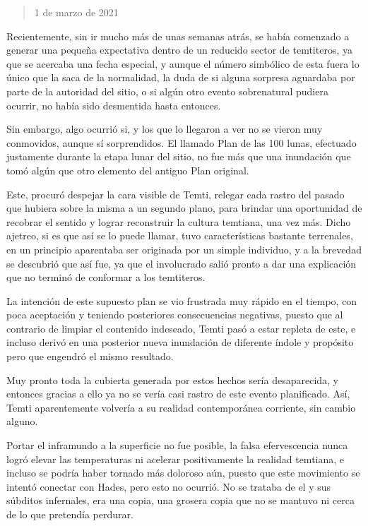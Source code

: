\documentclass[
  spanish,
]{book}
\begin{document}
\begin{quote}
1 de marzo de 2021
\end{quote}

Recientemente, sin ir mucho más de unas semanas atrás, se había comenzado a generar una pequeña expectativa dentro de un reducido sector de temtiteros, ya que se acercaba una fecha especial, y aunque el número simbólico de esta fuera lo único que la saca de la normalidad, la duda de si alguna sorpresa aguardaba por parte de la autoridad del sitio, o si algún otro evento sobrenatural pudiera ocurrir, no había sido desmentida hasta entonces.

Sin embargo, algo ocurrió si, y los que lo llegaron a ver no se vieron muy conmovidos, aunque sí sorprendidos. El llamado Plan de las 100 lunas, efectuado justamente durante la etapa lunar del sitio, no fue más que una inundación que tomó algún que otro elemento del antiguo Plan original.

Este, procuró despejar la cara visible de Temti, relegar cada rastro del pasado que hubiera sobre la misma a un segundo plano, para brindar una oportunidad de recobrar el sentido y lograr reconstruir la cultura temtiana, una vez más. Dicho ajetreo, si es que así se lo puede llamar, tuvo características bastante terrenales, en un principio aparentaba ser originada por un simple individuo, y a la brevedad se descubrió que así fue, ya que el involucrado salió pronto a dar una explicación que no terminó de conformar a los temtiteros.

La intención de este supuesto plan se vio frustrada muy rápido en el tiempo, con poca aceptación y teniendo posteriores consecuencias negativas, puesto que al contrario de limpiar el contenido indeseado, Temti pasó a estar repleta de este, e incluso derivó en una posterior nueva inundación de diferente índole y propósito pero que engendró el mismo resultado.

Muy pronto toda la cubierta generada por estos hechos sería desaparecida, y entonces gracias a ello ya no se vería casi rastro de este evento planificado. Así, Temti aparentemente volvería a su realidad contemporánea corriente, sin cambio alguno.

Portar el inframundo a la superficie no fue posible, la falsa efervescencia nunca logró elevar las temperaturas ni acelerar positivamente la realidad temtiana, e incluso se podría haber tornado más doloroso aún, puesto que este movimiento se intentó conectar con Hades, pero esto no ocurrió. No se trataba de el y sus súbditos infernales, era una copia, una grosera copia que no se mantuvo ni cerca de lo que pretendía perdurar.
\end{document}
